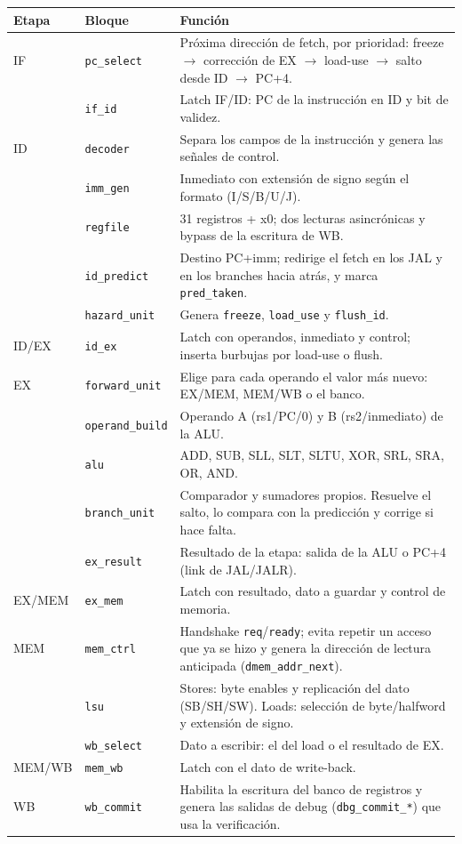 \documentclass[11pt,a4paper]{article}
\newcommand{\code}[1]{\texttt{#1}}
\begin{document}
\begin{center}
\small
\begin{tabularx}{\linewidth}{llL}
\toprule
Etapa & Bloque & Función \\
\midrule
IF & \code{pc\_select} & Próxima dirección de fetch, por prioridad: freeze $\to$ corrección de EX $\to$ load-use $\to$ salto desde ID $\to$ PC+4. \\
   & \code{if\_id} & Latch IF/ID: PC de la instrucción en ID y bit de validez. \\
\midrule
ID & \code{decoder} & Separa los campos de la instrucción y genera las señales de control. \\
   & \code{imm\_gen} & Inmediato con extensión de signo según el formato (I/S/B/U/J). \\
   & \code{regfile} & 31 registros + x0; dos lecturas asincrónicas y bypass de la escritura de WB. \\
   & \code{id\_predict} & Destino PC+imm; redirige el fetch en los JAL y en los branches hacia atrás, y marca \code{pred\_taken}. \\
   & \code{hazard\_unit} & Genera \code{freeze}, \code{load\_use} y \code{flush\_id}. \\
\midrule
ID/EX & \code{id\_ex} & Latch con operandos, inmediato y control; inserta burbujas por load-use o flush. \\
\midrule
EX & \code{forward\_unit} & Elige para cada operando el valor más nuevo: EX/MEM, MEM/WB o el banco. \\
   & \code{operand\_build} & Operando A (rs1/PC/0) y B (rs2/inmediato) de la ALU. \\
   & \code{alu} & ADD, SUB, SLL, SLT, SLTU, XOR, SRL, SRA, OR, AND. \\
   & \code{branch\_unit} & Comparador y sumadores propios. Resuelve el salto, lo compara con la predicción y corrige si hace falta. \\
   & \code{ex\_result} & Resultado de la etapa: salida de la ALU o PC+4 (link de JAL/JALR). \\
\midrule
EX/MEM & \code{ex\_mem} & Latch con resultado, dato a guardar y control de memoria. \\
\midrule
MEM & \code{mem\_ctrl} & Handshake \code{req}/\code{ready}; evita repetir un acceso que ya se hizo y genera la dirección de lectura anticipada (\code{dmem\_addr\_next}). \\
    & \code{lsu} & Stores: byte enables y replicación del dato (SB/SH/SW). Loads: selección de byte/halfword y extensión de signo. \\
    & \code{wb\_select} & Dato a escribir: el del load o el resultado de EX. \\
\midrule
MEM/WB & \code{mem\_wb} & Latch con el dato de write-back. \\
\midrule
WB & \code{wb\_commit} & Habilita la escritura del banco de registros y genera las salidas de debug (\code{dbg\_commit\_*}) que usa la verificación. \\
\bottomrule
\end{tabularx}
\end{center}
\end{document}
